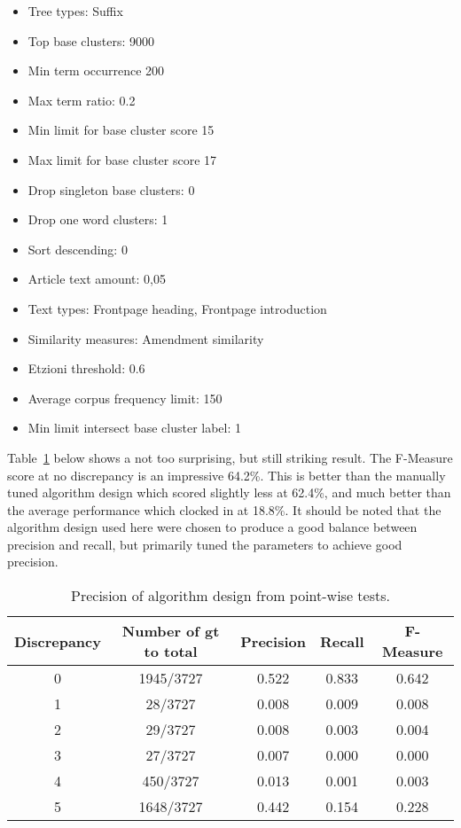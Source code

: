 \begin{itemize}
  \item Tree types: Suffix
  \item Top base clusters: 9000
  \item Min term occurrence 200
  \item Max term ratio: 0.2
  \item Min limit for base cluster score 15
  \item Max limit for base cluster score 17
  \item Drop singleton base clusters: 0
  \item Drop one word clusters: 1
  \item Sort descending: 0
  \item Article text amount: 0,05
  \item Text types: Frontpage heading, Frontpage introduction
  \item Similarity measures: Amendment similarity
  \item Etzioni threshold: 0.6
  \item Average corpus frequency limit: 150
  \item Min limit intersect base cluster label: 1
\end{itemize}

Table~\ref{tab:incrementalparametersresults} below shows a not too surprising, but still striking result. The F-Measure score at no discrepancy is an impressive 64.2\%. This is better than the manually tuned \citeauthor{Moe2013compact} algorithm design which scored slightly less at 62.4\%, and much better than the average performance which clocked in at 18.8\%. It should be noted that the \citeauthor{Moe2013compact} algorithm design used here were chosen to produce a good balance between precision and recall, but \cite{Moe2013compact} primarily tuned the parameters to achieve good precision.

\begin{table}[H]
\begin{center}
\begin{tabular}{|c|c|ccc|}
\hline
Discrepancy & Number of gt to total & Precision & Recall & F-Measure\\ 
\hline
0&   1945/3727&   0.522&    0.833&    0.642\\ 
1&   28/3727&     0.008&    0.009&    0.008\\ 
2&   29/3727&     0.008&    0.003&    0.004\\ 
3&   27/3727&     0.007&    0.000&    0.000\\
4&   450/3727&    0.013&    0.001&    0.003\\ 
5&   1648/3727&   0.442&    0.154&    0.228\\ 
\hline
\end{tabular}
\end{center}
\caption{Precision of algorithm design from point-wise tests.}
\label{tab:incrementalparametersresults}
\end{table}


